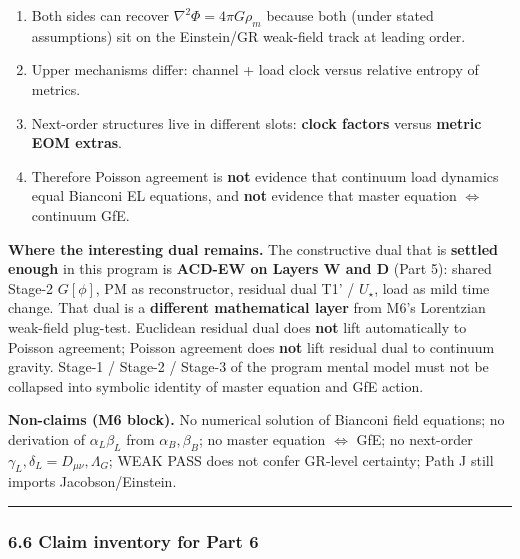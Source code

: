 \documentclass[
  11pt,
]{article}
\providecommand{\tightlist}{%
  \setlength{\itemsep}{0pt}\setlength{\parskip}{0pt}}
\begin{document}
\begin{enumerate}
\def\labelenumi{\arabic{enumi}.}
\tightlist
\item
  Both sides can recover \(\nabla^2\Phi=4\pi G\rho_m\) because both
  (under stated assumptions) sit on the Einstein/GR weak-field track at
  leading order.
\item
  Upper mechanisms differ: channel + load clock versus relative entropy
  of metrics.
\item
  Next-order structures live in different slots: \textbf{clock factors}
  versus \textbf{metric EOM extras}.
\item
  Therefore Poisson agreement is \textbf{not} evidence that continuum
  load dynamics equal Bianconi EL equations, and \textbf{not} evidence
  that master equation \(\Leftrightarrow\) continuum GfE.
\end{enumerate}

\textbf{Where the interesting dual remains.} The constructive dual that
is \textbf{settled enough} in this program is \textbf{ACD-EW on Layers W
and D} (Part 5): shared Stage-2 \(G[\phi]\), PM as reconstructor,
residual dual T1' / \(U_\star\), load as mild time change. That dual is
a \textbf{different mathematical layer} from M6's Lorentzian weak-field
plug-test. Euclidean residual dual does \textbf{not} lift automatically
to Poisson agreement; Poisson agreement does \textbf{not} lift residual
dual to continuum gravity. Stage-1 / Stage-2 / Stage-3 of the program
mental model must not be collapsed into symbolic identity of master
equation and GfE action.

\textbf{Non-claims (M6 block).} No numerical solution of Bianconi field
equations; no derivation of \(\alpha_L\beta_L\) from
\(\alpha_B,\beta_B\); no master equation \(\Leftrightarrow\) GfE; no
next-order \(\gamma_L,\delta_L=D_{\mu\nu},\Lambda_G\); WEAK PASS does
not confer GR-level certainty; Path J still imports Jacobson/Einstein.

\begin{center}\rule{0.5\linewidth}{0.5pt}\end{center}

\subsubsection{6.6 Claim inventory for Part
6}\label{claim-inventory-for-part-6}
\end{document}
